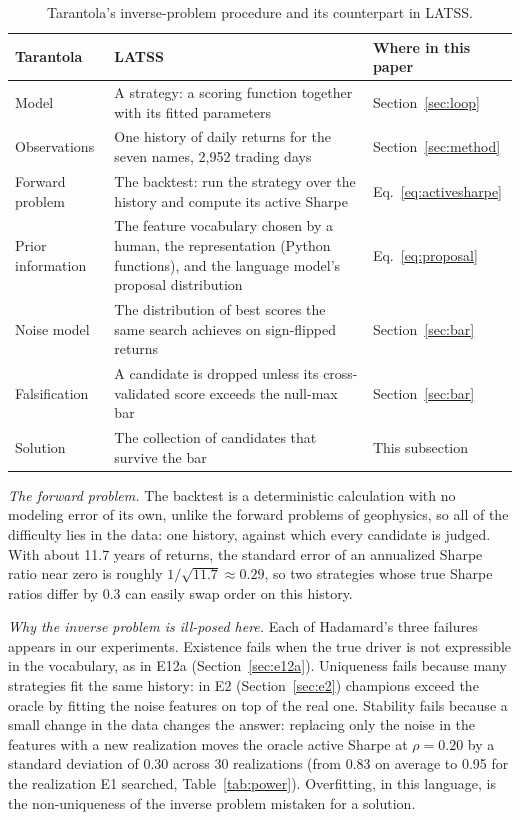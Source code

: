 \documentclass[11pt]{article}
\begin{document}
\begin{table}[htbp]
\centering
\caption{Tarantola's inverse-problem procedure and its counterpart in LATSS.}
\label{tab:tarantolamap}
\small
\begin{tabular}{p{3.0cm} p{6.4cm} p{4.4cm}}
\toprule
Tarantola & LATSS & Where in this paper \\
\midrule
Model & A strategy: a scoring function together with its fitted parameters & Section~\ref{sec:loop} \\
Observations & One history of daily returns for the seven names, 2{,}952 trading days &
Section~\ref{sec:method} \\
Forward problem & The backtest: run the strategy over the history and compute its active Sharpe &
Eq.~\eqref{eq:activesharpe} \\
Prior information & The feature vocabulary chosen by a human, the representation (Python functions), and the
language model's proposal distribution & Eq.~\eqref{eq:proposal} \\
Noise model & The distribution of best scores the same search achieves on sign-flipped returns &
Section~\ref{sec:bar} \\
Falsification & A candidate is dropped unless its cross-validated score exceeds the null-max bar &
Section~\ref{sec:bar} \\
Solution & The collection of candidates that survive the bar & This subsection \\
\bottomrule
\end{tabular}
\end{table}

\emph{The forward problem.} The backtest is a deterministic calculation with no modeling error of its
own, unlike the forward problems of geophysics, so all of the difficulty lies in the data: one history,
against which every candidate is judged. With about 11.7 years of returns, the standard error of an
annualized Sharpe ratio near zero is roughly $1/\sqrt{11.7}\approx 0.29$, so two strategies whose true
Sharpe ratios differ by 0.3 can easily swap order on this history.

\emph{Why the inverse problem is ill-posed here.} Each of Hadamard's three failures appears in our
experiments. Existence fails when the true driver is not expressible in the vocabulary, as in E12a
(Section~\ref{sec:e12a}). Uniqueness fails because many strategies fit the same history: in E2
(Section~\ref{sec:e2}) champions exceed the oracle by fitting the noise features on top of the real one.
Stability fails because a small change in the data changes the answer: replacing only the noise in the
features with a new realization moves the oracle active Sharpe at $\rho=0.20$ by a standard deviation of
0.30 across 30 realizations (from 0.83 on average to 0.95 for the realization E1 searched,
Table~\ref{tab:power}). Overfitting, in this language, is the non-uniqueness of the inverse problem
mistaken for a solution.
\end{document}
